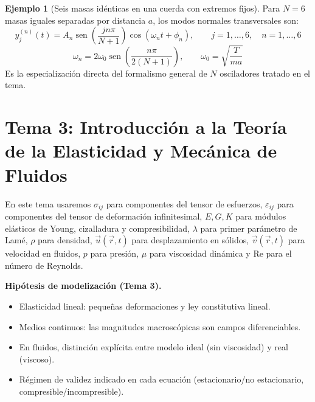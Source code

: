 \documentclass[12pt, a4paper]{article}
\theoremstyle{plain}
\theoremstyle{definition}
\newtheorem{ejemplo}{Ejemplo}[section]
\theoremstyle{remark}
\newcommand{\ve}[1]{\vec{#1}}
\DeclareMathOperator{\sen}{sen}
\begin{document}
\begin{ejemplo}[Seis masas idénticas en una cuerda con extremos fijos]
Para $N=6$ masas iguales separadas por distancia $a$, los modos normales transversales son:
\begin{equation}
  y_j^{(n)}(t)=A_n\sen\!\left(\frac{jn\pi}{N+1}\right)\cos(\omega_n t+\phi_n),
  \qquad j=1,\dots,6,\quad n=1,\dots,6
\end{equation}
\begin{equation}
  \omega_n=2\omega_0\sen\!\left(\frac{n\pi}{2(N+1)}\right),
  \qquad
  \omega_0=\sqrt{\frac{T}{ma}}
\end{equation}
Es la especialización directa del formalismo general de $N$ osciladores tratado en el tema.
\end{ejemplo}

\section{Tema 3: Introducción a la Teoría de la Elasticidad y Mecánica de Fluidos}

En este tema usaremos $\sigma_{ij}$ para componentes del tensor de esfuerzos,
$\varepsilon_{ij}$ para componentes del tensor de deformación infinitesimal, $E,G,K$ para
módulos elásticos de Young, cizalladura y compresibilidad, $\lambda$ para primer parámetro
de Lamé, $\rho$ para densidad, $\ve{u}(\ve{r},t)$ para desplazamiento en sólidos,
$\ve{v}(\ve{r},t)$ para velocidad en fluidos, $p$ para presión, $\mu$ para viscosidad
dinámica y $\mathrm{Re}$ para el número de Reynolds.

\begin{mdframed}[style=resultado]
\textbf{Hipótesis de modelización (Tema 3).}
\begin{itemize}
  \item Elasticidad lineal: pequeñas deformaciones y ley constitutiva lineal.
  \item Medios continuos: las magnitudes macroscópicas son campos diferenciables.
  \item En fluidos, distinción explícita entre modelo ideal (sin viscosidad) y real (viscoso).
  \item Régimen de validez indicado en cada ecuación (estacionario/no estacionario, compresible/incompresible).
\end{itemize}
\end{mdframed}
\end{document}
